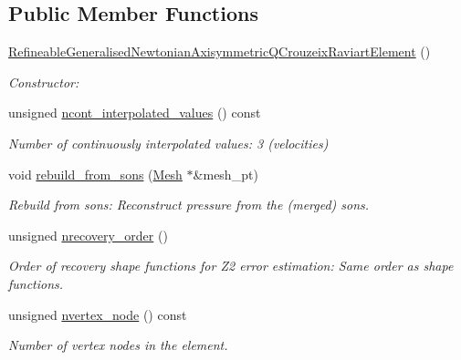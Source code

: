 \subsection*{Public Member Functions}
\begin{DoxyCompactItemize}
\item 
\hyperlink{classoomph_1_1RefineableGeneralisedNewtonianAxisymmetricQCrouzeixRaviartElement_a829140738918bbec53a4a6a0b20356aa}{Refineable\+Generalised\+Newtonian\+Axisymmetric\+Q\+Crouzeix\+Raviart\+Element} ()
\begin{DoxyCompactList}\small\item\em Constructor\+: \end{DoxyCompactList}\item 
unsigned \hyperlink{classoomph_1_1RefineableGeneralisedNewtonianAxisymmetricQCrouzeixRaviartElement_a774dcb42390e7e3cf14a33c41cd957c3}{ncont\+\_\+interpolated\+\_\+values} () const
\begin{DoxyCompactList}\small\item\em Number of continuously interpolated values\+: 3 (velocities) \end{DoxyCompactList}\item 
void \hyperlink{classoomph_1_1RefineableGeneralisedNewtonianAxisymmetricQCrouzeixRaviartElement_a6e5fafc449c2e81723bbbb9cfba74764}{rebuild\+\_\+from\+\_\+sons} (\hyperlink{classoomph_1_1Mesh}{Mesh} $\ast$\&mesh\+\_\+pt)
\begin{DoxyCompactList}\small\item\em Rebuild from sons\+: Reconstruct pressure from the (merged) sons. \end{DoxyCompactList}\item 
unsigned \hyperlink{classoomph_1_1RefineableGeneralisedNewtonianAxisymmetricQCrouzeixRaviartElement_adf4666579138c21a202b3d55332dbb6e}{nrecovery\+\_\+order} ()
\begin{DoxyCompactList}\small\item\em Order of recovery shape functions for Z2 error estimation\+: Same order as shape functions. \end{DoxyCompactList}\item 
unsigned \hyperlink{classoomph_1_1RefineableGeneralisedNewtonianAxisymmetricQCrouzeixRaviartElement_a82be46c378226d5588fe8aeda0cef491}{nvertex\+\_\+node} () const
\begin{DoxyCompactList}\small\item\em Number of vertex nodes in the element. \end{DoxyCompactList}\item 

\end{DoxyCompactItemize}
